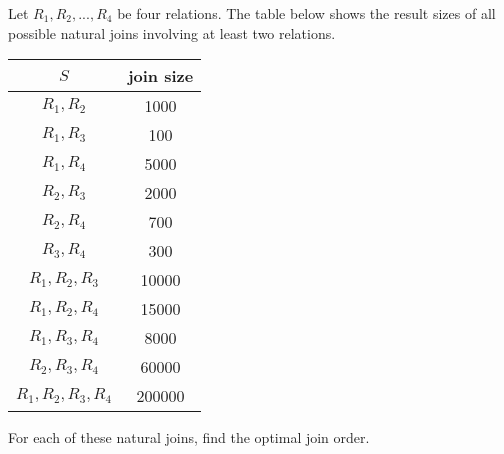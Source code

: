  Let $R_1, R_2, ..., R_4$ be four relations. The table below shows the result sizes of all possible natural joins involving at least two relations.

\begin{center}
    \begin{tabular}{c|c}
        $S$ & join size \\
        \hline
        $R_1,R_2$ & 1000 \\
        $R_1,R_3$ & 100 \\
        $R_1,R_4$ & 5000 \\
        $R_2,R_3$ & 2000 \\
        $R_2,R_4$ & 700 \\
        $R_3,R_4$ & 300 \\
        $R_1, R_2, R_3$ & 10000 \\
        $R_1, R_2, R_4$ & 15000 \\
        $R_1, R_3, R_4$ & 8000 \\
        $R_2, R_3, R_4$ & 60000 \\
        $R_1, R_2, R_3, R_4$ & 200000
    \end{tabular}
\end{center}

\noindent For each of these natural joins, find the optimal join order.

